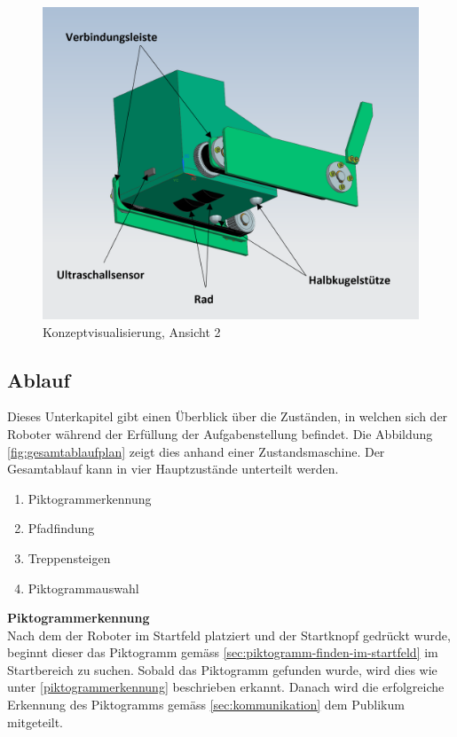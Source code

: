 \begin{figure}[H]
  \includegraphics[width=1\textwidth]{img/Treppensteigen/Geraetansicht2_final.PNG}
  \centering
  \caption{Konzeptvisualisierung, Ansicht 2}
  \label{fig:konzeptvisualisierung-ansicht2}
\end{figure}

\newpage

\subsection{Ablauf}
Dieses Unterkapitel gibt einen Überblick über die Zuständen, in welchen sich der Roboter während der Erfüllung der Aufgabenstellung befindet. Die Abbildung \ref{fig:gesamtablaufplan} zeigt dies anhand einer Zustandsmaschine. Der Gesamtablauf kann in vier Hauptzustände unterteilt werden. 
\begin{enumerate}
    \item Piktogrammerkennung
    \item Pfadfindung
    \item Treppensteigen
    \item Piktogrammauswahl
\end{enumerate}

\textbf{Piktogrammerkennung}\\
Nach dem der Roboter im Startfeld platziert und der Startknopf gedrückt wurde, beginnt dieser das Piktogramm gemäss \ref{sec:piktogramm-finden-im-startfeld} im Startbereich zu suchen. Sobald das Piktogramm gefunden wurde, wird dies wie unter \ref{piktogrammerkennung} beschrieben erkannt. Danach wird die erfolgreiche Erkennung des Piktogramms gemäss \ref{sec:kommunikation} dem Publikum mitgeteilt. 

